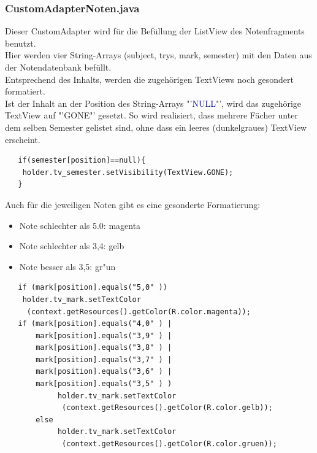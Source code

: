 \begin{description}
\subsubsection{CustomAdapterNoten.java}
Dieser CustomAdapter wird für die Befüllung der ListView des Notenfragments benutzt.\\
Hier werden vier String-Arrays (\textcolor{lila}{subject}, \textcolor{lila}{trys}, \textcolor{lila}{mark}, \textcolor{lila}{semester}) mit den Daten aus der Notendatenbank befüllt.\\
Entsprechend des Inhalts, werden die zugehörigen TextViews noch gesondert formatiert.\\
Ist der Inhalt an der Position des String-Arrays "'\textcolor{darkblue}{NULL}"', wird das zugehörige TextView auf "'\textcolor{lila}{GONE}"' gesetzt. So wird realisiert, dass mehrere Fächer unter dem selben Semester gelistet sind, ohne dass ein leeres (dunkelgraues) TextView erscheint.
\begin{lstlisting}
   if(semester[position]==null){
    holder.tv_semester.setVisibility(TextView.GONE);
   }
\end{lstlisting}
Auch für die jeweiligen Noten gibt es eine gesonderte Formatierung:
\begin{itemize}
\item Note schlechter als 5.0: \textcolor{magentat}{magenta}
\item Note schlechter als 3,4: \textcolor{gelbt}{gelb}
\item Note besser als 3,5: \textcolor{gruent}{gr"un}
\end{itemize}
\begin{lstlisting}
   if (mark[position].equals("5,0" ))
    holder.tv_mark.setTextColor
     (context.getResources().getColor(R.color.magenta));
   if (mark[position].equals("4,0" ) |
       mark[position].equals("3,9" ) |
       mark[position].equals("3,8" ) |
       mark[position].equals("3,7" ) |
       mark[position].equals("3,6" ) |
       mark[position].equals("3,5" ) )
            holder.tv_mark.setTextColor
             (context.getResources().getColor(R.color.gelb));
       else
            holder.tv_mark.setTextColor
             (context.getResources().getColor(R.color.gruen));
\end{lstlisting}


\end{description}
